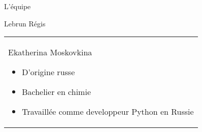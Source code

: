 \begin{frame}{L'équipe}
\begin{minipage}{0.45\textwidth}
Lebrun Régis
\end{minipage}%
\hfill
\begin{minipage}{0.45\textwidth}
\begin{tabular}{|p{\textwidth}}
Ekatherina Moskovkina
\begin{itemize}
\item D'origine russe
\item Bachelier en chimie
\item Travaillée comme developpeur Python en Russie
\end{itemize}
\end{tabular}
\end{minipage}%
\end{frame}